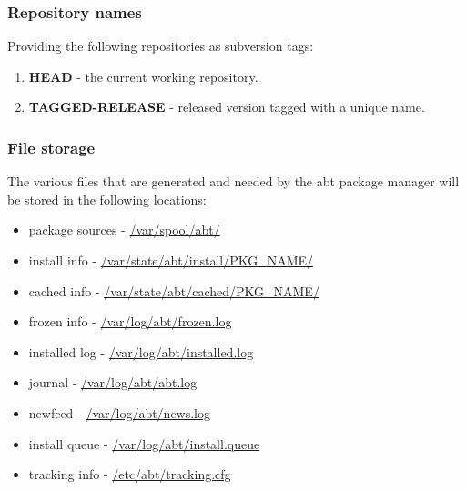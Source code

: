 \subsubsection{Repository names}
Providing the following repositories as subversion tags:

\begin{enumerate}
  \item \textbf{HEAD} - the current working repository.
  \item \textbf{TAGGED-RELEASE} - released version tagged with a unique name.
\end{enumerate}

\subsubsection{File storage}
The various files that are generated and needed by the abt package manager will be stored in the following locations:

\begin{itemize}
  \item package sources - \url{/var/spool/abt/}
  \item install info - \url{/var/state/abt/install/PKG_NAME/}
  \item cached info - \url{/var/state/abt/cached/PKG_NAME/}
  \item frozen info - \url{/var/log/abt/frozen.log}
  \item installed log - \url{/var/log/abt/installed.log}
  \item journal - \url{/var/log/abt/abt.log}
  \item newfeed - \url{/var/log/abt/news.log}
  \item install queue - \url{/var/log/abt/install.queue}
  \item tracking info - \url{/etc/abt/tracking.cfg}
\end{itemize}

